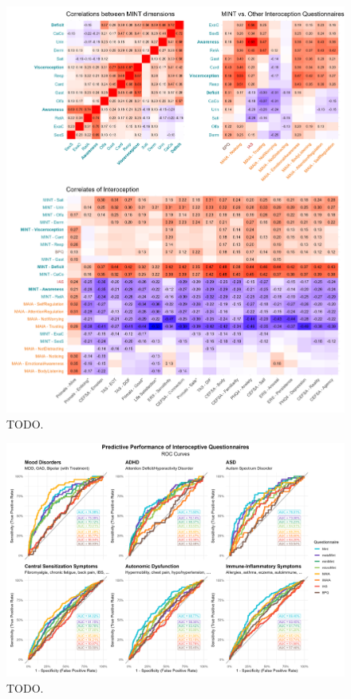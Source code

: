 \documentclass[
  jou,
  floatsintext,
  longtable,
  nolmodern,
  notxfonts,
  notimes,
  colorlinks=true,linkcolor=blue,citecolor=blue,urlcolor=blue]{apa7}
\begin{document}
\begin{figure}[!htbp]

{\caption{{TODO.}{\label{fig-four}}}}

\begin{center}
\includegraphics[width=1\linewidth,height=\textheight,keepaspectratio]{../study2/analysis/figures/fig2.png}
\end{center}

\end{figure}

\begin{figure}[!htbp]

{\caption{{TODO.}{\label{fig-five}}}}

\begin{center}
\includegraphics[width=1\linewidth,height=\textheight,keepaspectratio]{../study2/analysis/figures/fig3.png}
\end{center}

\end{figure}
\end{document}
